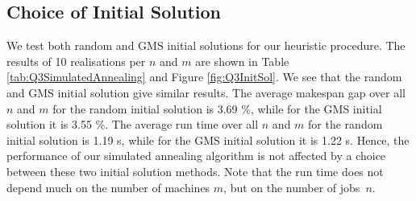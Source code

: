 \documentclass[12pt,a4paper,reqno]{article}
\begin{document}
\begin{figure}[H]
\end{figure}



\subsection*{Choice of Initial Solution}
We test both random and GMS initial solutions for our heuristic procedure. The results of 10 realisations per $n$ and $m$ are shown in Table \ref{tab:Q3SimulatedAnnealing} and Figure \ref{fig:Q3InitSol}. We see that the random and GMS initial solution give similar results. The average makespan gap over all $n$ and $m$ for the random initial solution is 3.69 \%, while for the GMS initial solution it is 3.55 \%. The average run time over all $n$ and $m$ for the random initial solution is 1.19 s, while for the GMS initial solution it is 1.22 s. Hence, the performance of our simulated annealing algorithm is not affected by a choice between these two initial solution methods. Note that the run time does not depend much on the number of machines $m$, but on the number of jobs~$n$.
\end{document}
